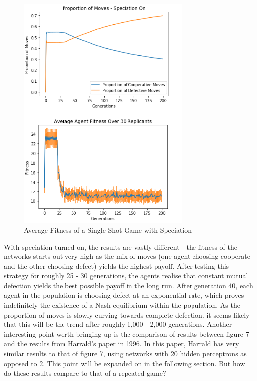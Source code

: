 \documentclass[12pt,a4paper]{article}
\begin{document}
\begin{figure}[H]
	\centering
		\includegraphics[width=0.75\textwidth]{RatioSpeciationOn}
		\caption{Average Fitness of a Single-Shot Game with Speciation}
\end{figure}

With speciation turned on, the results are vastly different - the fitness of the networks starts out very high as the mix of moves (one agent choosing cooperate and the other choosing defect) yields the highest payoff. After testing this strategy for roughly 25 - 30 generations, the agents realise that constant mutual defection yields the best possible payoff in the long run. After generation 40, each agent in the population is choosing defect at an exponential rate, which proves indefinitely the existence of a Nash equilibrium within the population. As the proportion of moves is slowly curving towards complete defection, it seems likely that this will be the trend after roughly 1,000 - 2,000 generations. Another interesting point worth bringing up is the comparison of results between figure 7 and the results from Harrald's\cite{25} paper in 1996. In this paper, Harrald has very similar results to that of figure 7, using networks with 20 hidden perceptrons as opposed to 2. This point will be expanded on in the following section. But how do these results compare to that of a repeated game?
\end{document}
